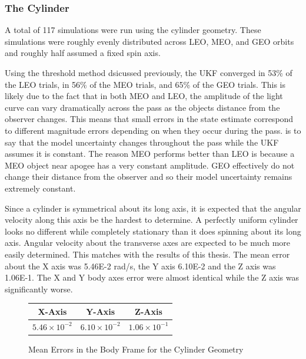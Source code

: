 
\subsubsection{The Cylinder}

A total of 117 simulations were run using the cylinder geometry. These simulations were roughly evenly distributed across LEO, MEO, and GEO orbits and roughly half assumed a fixed spin axis.

Using the threshold method dsicussed previously, the UKF converged in 53\% of the LEO trials, in 56\% of the MEO trials, and 65\% of the GEO trials. This is likely due to the fact that in both MEO and LEO, the amplitude of the light curve can vary dramatically across the pass as the objects distance from the observer changes. This means that small errors in the state estimate correspond to different magnitude errors depending on when they occur during the pass.  is to say that the model uncertainty changes throughout the pass while the UKF assumes it is constant. The reason MEO performs better than LEO is because a MEO object near apogee has a very constant amplitude. GEO effectively do not change their distance from the observer and so their model uncertainty remains extremely constant.


Since a cylinder is symmetrical about its long axis, it is expected that the angular velocity along this axis be the hardest to determine. A perfectly uniform cylinder looks no different while completely stationary than it does spinning about its long axis. Angular velocity about the transverse axes are expected to be much more easily determined. This matches with the results of this thesis. The mean error about the X axis was 5.46E-2 rad/s, the Y axis 6.10E-2 and the Z axis was 1.06E-1. The X and Y body axes error were almost identical while the Z axis was significantly worse.

\begin{figure}[ht]
	\begin{center}
		\begin{tabular}{| c | c | c |}
			\hline X-Axis & Y-Axis & Z-Axis \\ 
			\hline $5.46\times 10^{-2}$ & $6.10\times 10^{-2}$ & $1.06\times 10^{-1}$ \\
			\hline
		\end{tabular}
	\end{center}
	\caption{Mean Errors in the Body Frame for the Cylinder Geometry}
\end{figure}

